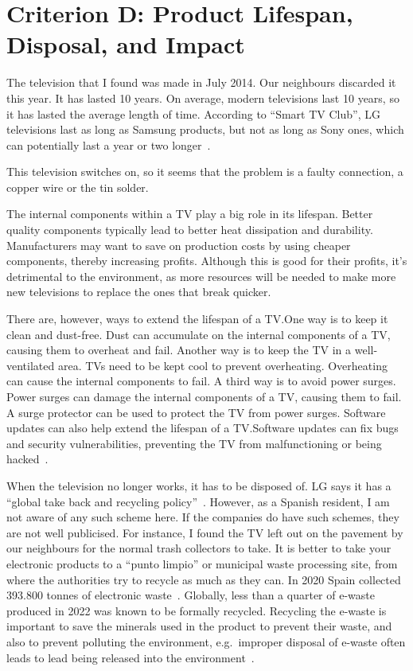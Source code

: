 \documentclass[12pt, letterpaper]{article}
\begin{document}
\section{Criterion D: Product Lifespan, Disposal, and Impact}

The television that I found was made in July 2014. Our neighbours
discarded it this year. It has lasted 10 years. On average, modern
televisions last 10 years, so it has lasted the average length of
time. According to ``Smart TV Club'', LG televisions last as long as
Samsung products, but not as long as Sony ones, which can potentially
last a year or two longer~\autocite{raj-2024}.

This television switches on, so it seems that the problem is a faulty
connection, a copper wire or the tin solder.

The internal components within a TV play a big role in its lifespan.
Better quality components typically lead to better heat dissipation
and durability. Manufacturers may want to save on production costs by
using cheaper components, thereby increasing profits. Although this
is good for their profits, it's detrimental to the environment, as
more resources will be needed to make more new televisions to replace
the ones that break quicker.

There are, however, ways to extend the lifespan of a TV.\@ One way is to
keep it clean and dust-free. Dust can accumulate on the internal
components of a TV, causing them to overheat and fail. Another way is
to keep the TV in a well-ventilated area. TVs need to be kept cool to
prevent overheating. Overheating can cause the internal components to
fail. A third way is to avoid power surges. Power surges can damage
the internal components of a TV, causing them to fail. A surge
protector can be used to protect the TV from power surges. Software
updates can also help extend the lifespan of a TV.\@ Software updates
can fix bugs and security vulnerabilities, preventing the TV from
malfunctioning or being hacked~\autocite{raj-2024}.

When the television no longer works, it has to be disposed of. LG
says it has a ``global take back and recycling
policy''~\autocite{lg-electronics-no-dateB}. However, as a Spanish
resident, I am not aware of any such scheme here. If the companies do
have such schemes, they are not well publicised. For instance, I
found the TV left out on the pavement by our neighbours for
the normal trash collectors to take. It is better to take your
electronic products to a ``punto limpio'' or municipal waste processing
site, from where the authorities try to recycle as much as they can.
In 2020 Spain collected 393.800 tonnes of electronic
waste~\autocite{it-digital-media-group-2023}.
Globally, less than a quarter of e-waste produced in 2022 was known
to be formally recycled. Recycling the e-waste is important to save
the minerals used in the product to prevent their waste, and also to
prevent polluting the environment, e.g.\ improper disposal of e-waste
often leads to lead being released into the
environment~\autocite{world-health-organization-2024}.
\end{document}
